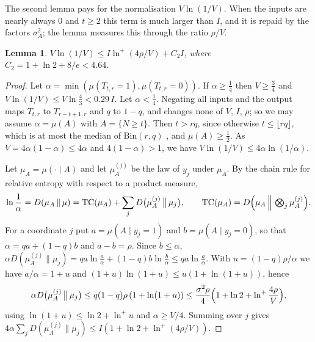 \documentclass[11pt]{amsart}
\newtheorem{lemma}[theorem]{Lemma}
\theoremstyle{definition}
\theoremstyle{remark}
\newcommand{\Bin}{\mathrm{Bin}}
\begin{document}
The second lemma pays for the normalisation $V\ln(1/V)$. When the inputs are nearly always $0$ and $t\ge2$ this
term is much larger than $I$, and it is repaid by the factors $\sigma_A^2$; the lemma measures this through the ratio
$\rho/V$.

\begin{lemma}\label{lem:thr-credit}
$V\ln(1/V)\le I\ln^+(4\rho/V)+C_2I$, where $C_2=1+\ln2+8/e<4.64$.
\end{lemma}

\begin{proof}
Let $\alpha=\min(\mu(T_{t,r}=1),\mu(T_{t,r}=0))$. If $\alpha\ge\frac14$ then $V\ge\frac34$ and
$V\ln(1/V)\le V\ln\frac43<0.29\,I$. Let $\alpha<\frac14$. Negating all inputs and the output maps $T_{t,r}$ to
$T_{r-t+1,r}$ and $q$ to $1-q$, and changes none of $V$, $I$, $\rho$; so we may assume $\alpha=\mu(A)$ with
$A=\{N\ge t\}$. Then $t>rq$, since otherwise $t\le\lfloor rq\rfloor$, which is at most the median of $\Bin(r,q)$
\cite{KB80}, and $\mu(A)\ge\frac12$. As $V=4\alpha(1-\alpha)\le4\alpha$ and $4(1-\alpha)>1$, we have
$V\ln(1/V)\le4\alpha\ln(1/\alpha)$.

Let $\mu_A=\mu(\cdot\mid A)$ and let $\mu_A^{(j)}$ be the law of $y_j$ under $\mu_A$. By the chain rule for relative
entropy with respect to a product measure,
\[
\ln\frac1\alpha=D(\mu_A\,\|\,\mu)=\mathrm{TC}(\mu_A)+\sum_jD\bigl(\mu_A^{(j)}\,\big\|\,\mu_j\bigr),\qquad
\mathrm{TC}(\mu_A)=D\Bigl(\mu_A\,\Big\|\,\textstyle\bigotimes_j\mu_A^{(j)}\Bigr).
\]
For a coordinate $j$ put $a=\mu(A\mid y_j=1)$ and $b=\mu(A\mid y_j=0)$, so that $\alpha=qa+(1-q)b$ and $a-b=\rho$.
Since $b\le\alpha$, $\alpha D(\mu_A^{(j)}\|\mu_j)=qa\ln\frac a\alpha+(1-q)b\ln\frac b\alpha\le qa\ln\frac a\alpha$.
With $u=(1-q)\rho/\alpha$ we have $a/\alpha=1+u$ and $(1+u)\ln(1+u)\le u(1+\ln(1+u))$, hence
\[
\alpha D\bigl(\mu_A^{(j)}\,\big\|\,\mu_j\bigr)\le q(1-q)\rho\,(1+\ln(1+u))\le\frac{\sigma^2\rho}4\Bigl(1+\ln2+\ln^+\frac{4\rho}V\Bigr),
\]
using $\ln(1+u)\le\ln2+\ln^+u$ and $\alpha\ge V/4$. Summing over $j$ gives $4\alpha\sum_jD(\mu_A^{(j)}\|\mu_j)\le
I(1+\ln2+\ln^+(4\rho/V))$.


\end{proof}
\end{document}
